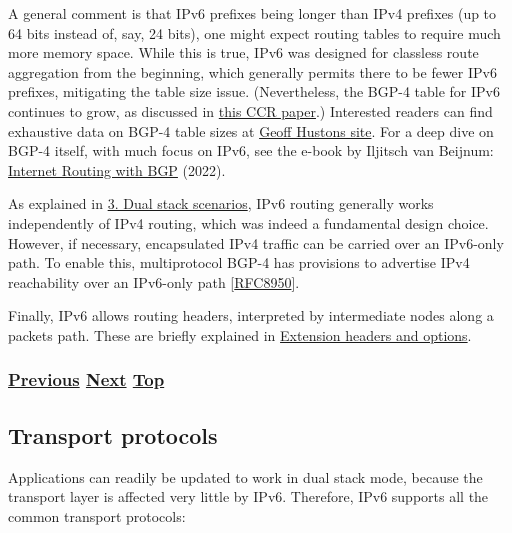 \documentclass[
]{article}
\begin{document}
A general comment is that IPv6 prefixes being longer than IPv4 prefixes
(up to 64 bits instead of, say, 24 bits), one might expect routing
tables to require much more memory space. While this is true, IPv6 was
designed for classless route aggregation from the beginning, which
generally permits there to be fewer IPv6 prefixes, mitigating the table
size issue. (Nevertheless, the BGP-4 table for IPv6 continues to grow,
as discussed in
\href{https://dl.acm.org/doi/10.1145/3477482.3477490}{this CCR paper}.)
Interested readers can find exhaustive data on BGP-4 table sizes at
\href{https://bgp.potaroo.net/index-bgp.html}{Geoff
Huston\textquotesingle s site}. For a deep dive on BGP-4 itself, with
much focus on IPv6, see the e-book by Iljitsch van Beijnum:
\href{https://www.iljitsch.com/2022/11-18-new-e-book-internet-routing-with-bgp.html}{Internet
Routing with BGP} (2022).

As explained in \hyperref[dual-stack-scenarios]{3. Dual stack
scenarios}, IPv6 routing generally works independently of IPv4 routing,
which was indeed a fundamental design choice. However, if necessary,
encapsulated IPv4 traffic can be carried over an IPv6-only path. To
enable this, multiprotocol BGP-4 has provisions to advertise IPv4
reachability over an IPv6-only path
{[}\href{https://www.rfc-editor.org/info/rfc8950}{RFC8950}{]}.

Finally, IPv6 allows routing headers, interpreted by intermediate nodes
along a packet\textquotesingle s path. These are briefly explained in
\hyperref[extension-headers-and-options]{Extension headers and options}.

\subsubsection{\texorpdfstring{\hyperref[dns]{Previous}
\hyperref[transport-protocols]{Next}
\hyperref[ipv6-basic-technology]{Top}}{Previous Next Top}}\label{previous-next-top-14}

\pagebreak

\subsection{Transport protocols}\label{transport-protocols}

Applications can readily be updated to work in dual stack mode, because
the transport layer is affected very little by IPv6. Therefore, IPv6
supports all the common transport protocols:
\end{document}
